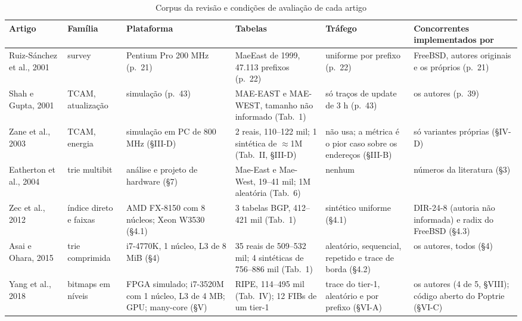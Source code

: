 \documentclass[conference,a4paper]{IEEEtran}
\begin{document}
\begin{table}[t]
\centering
\caption{Corpus da revisão e condições de avaliação de cada artigo}
\label{tab:corpus}
\footnotesize
\begin{tabular}{P{2.3cm} P{2.0cm} P{3.0cm} P{3.4cm} P{2.8cm} P{2.8cm}}
\toprule
Artigo & Família & Plataforma & Tabelas & Tráfego & Concorrentes implementados por \\
\midrule
Ruiz-Sánchez et al., 2001~\cite{ruiz01} & survey & Pentium Pro 200 MHz (p.~21) & MaeEast de 1999, 47.113 prefixos (p.~22) & uniforme por prefixo (p.~22) & FreeBSD, autores originais e os próprios (p.~21) \\
Shah e Gupta, 2001~\cite{shah01} & TCAM, atualização & simulação (p.~43) & MAE-EAST e MAE-WEST, tamanho não informado (Tab.~1) & só traços de update de 3 h (p.~43) & os autores (p.~39) \\
Zane et al., 2003~\cite{zane03} & TCAM, energia & simulação em PC de 800 MHz (\S III-D) & 2 reais, 110--122 mil; 1 sintética de $\approx$1M (Tab.~II, \S III-D) & não usa; a métrica é o pior caso sobre os endereços (\S III-B) & só variantes próprias (\S IV-D) \\
Eatherton et al., 2004~\cite{eath04} & trie multibit & análise e projeto de hardware (\S7) & Mae-East e Mae-West, 19--41 mil; 1M aleatória (Tab.~6) & nenhum & números da literatura (\S3) \\
Zec et al., 2012~\cite{zec12} & índice direto e faixas & AMD FX-8150 com 8 núcleos; Xeon W3530 (\S4.1) & 3 tabelas BGP, 412--421 mil (Tab.~1) & sintético uniforme (\S4.1) & DIR-24-8 (autoria não informada) e radix do FreeBSD (\S4.3) \\
Asai e Ohara, 2015~\cite{asai15} & trie comprimida & i7-4770K, 1 núcleo, L3 de 8 MiB (\S4) & 35 reais de 509--532 mil; 4 sintéticas de 756--886 mil (Tab.~1) & aleatório, sequencial, repetido e trace de borda (\S4.2) & os autores, todos (\S4) \\
Yang et al., 2018~\cite{yang18} & bitmaps em níveis & FPGA simulado; i7-3520M com 1 núcleo, L3 de 4 MB; GPU; many-core (\S V) & RIPE, 114--495 mil (Tab.~IV); 12 FIBs de um tier-1 & trace do tier-1, aleatório e por prefixo (\S VI-A) & os autores (4 de 5, \S VIII); código aberto do Poptrie (\S VI-C) \\
\bottomrule
\end{tabular}
\end{table}
\end{document}
